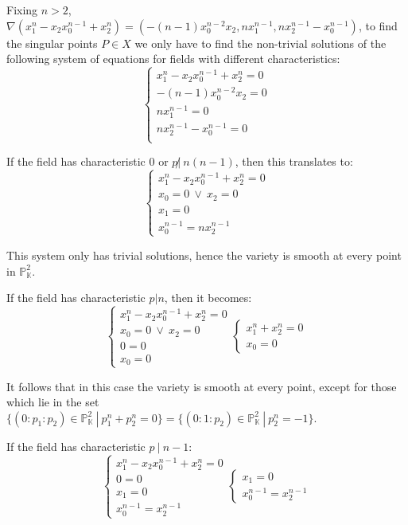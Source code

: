 \documentclass{article}
\newcommand{\numberset}{\mathbb}
\newcommand{\K}{\numberset{K}}
\newcommand{\Ps}{\mathbb{P}}
\begin{document}
Fixing $n>2$, $\nabla(x_1^n-x_2x_0^{n-1}+x_2^n)=(-(n-1)x_0^{n-2}x_2,nx_1^{n-1},nx_2^{n-1}-x_0^{n-1})$, to find the singular points $P\in X$ we only have to find the non-trivial solutions of the following system of equations for fields with different characteristics:
$$
\begin{cases}
  x_1^n-x_2x_0^{n-1}+x_2^n=0 \\
  -(n-1)x_0^{n-2}x_2=0 \\
  nx_1^{n-1}=0 \\
  nx_2^{n-1}-x_0^{n-1}=0 \\
\end{cases}
$$

If the field has characteristic 0 or $p\not |\ n(n-1)$, then this translates to:
$$
\begin{cases}
  x_1^n-x_2x_0^{n-1}+x_2^n=0 \\
  x_0=0\ \lor\ x_2=0 \\
  x_1=0 \\
  x_0^{n-1}=nx_2^{n-1}
\end{cases}
$$

This system only has trivial solutions, hence the variety is smooth at every point in $\Ps^2_{\K}$.

If the field has characteristic $p|n$, then it becomes:
$$
\begin{cases}
  x_1^n-x_2x_0^{n-1}+x_2^n=0 \\
  x_0=0\ \lor\ x_2=0 \\
  0=0 \\
  x_0=0
\end{cases}
\begin{cases}
  x_1^n+x_2^n=0 \\
  x_0=0
\end{cases}
$$

It follows that in this case the variety is smooth at every point, except for those which lie in the set $\{(0:p_1:p_2)\in\Ps^2_{\K}\ |\ p_1^n+p_2^n=0\}=\{(0:1:p_2)\in\Ps^2_{\K}\ |\ p_2^n=-1\}$.

If the field has characteristic $p\ |\ n-1$:
$$
\begin{cases}
  x_1^n-x_2x_0^{n-1}+x_2^n=0 \\
  0=0 \\
  x_1=0 \\
  x_0^{n-1}=x_2^{n-1}
\end{cases}
\begin{cases}
  x_1=0 \\
  x_0^{n-1}=x_2^{n-1}
\end{cases}
$$
\end{document}
